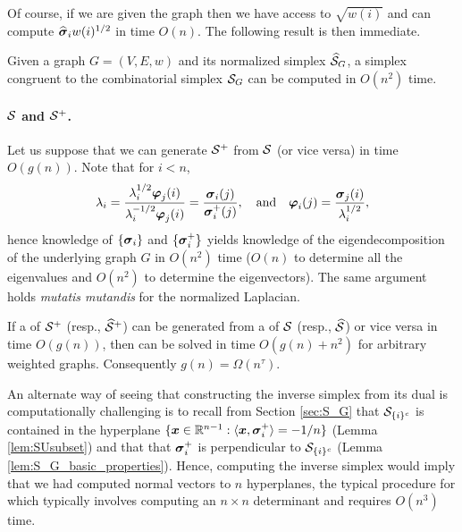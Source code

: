Of course, if we are given the graph then we have access to $\sqrt{w(i)}$ and can compute $\widehat{\vb*{\sigma}}_i w(i)^{1/2}$ in time $O(n)$. The following result is then immediate. 

\begin{lemma}
	Given a graph $G=(V,E,w)$ and its normalized simplex $\widehat{\mathcal{S}}_G$, a simplex congruent to  the combinatorial simplex $\mathcal{S}_G$ can be computed in $O(n^2)$ time. 
\end{lemma}




\paragraph{\texorpdfstring{$\mathcal{S}$}{The combinatorial} and \texorpdfstring{$\mathcal{S}^+$}{normalized simplex}.}

Let us suppose that we can generate $\mathcal{S}^+$ from $\mathcal{S}$ (or vice versa) in time $O(g(n))$. Note that for $i<n$, 
\[\lambda_i = \frac{\lambda_i^{1/2} \vb*{\varphi}_j(i)}{\lambda_i^{-1/2}\vb*{\varphi}_j(i)} = \frac{\vb*{\sigma}_i(j)}{\vb*{\sigma}_i^+(j)}, \quad \text{and} \quad \vb*{\varphi}_i(j) = \frac{\vb*{\sigma}_j(i)}{\lambda_i^{1/2}},\]
hence knowledge of $\{\vb*{\sigma}_i\}$ and $\{\vb*{\sigma}_i^+\}$ yields knowledge of the eigendecomposition of the underlying graph $G$ in $O(n^2)$ time ($O(n)$ to determine all the  eigenvalues and $O(n^2)$ to determine the eigenvectors). The same argument holds \emph{mutatis mutandis} for the normalized Laplacian. 

\begin{lemma}
	\label{lem:S_to_S^+_vdesc}
	If a \vdesc of $\mathcal{S}^+$  (resp., $\widehat{\mathcal{S}}^+$) can be generated from a \vdesc of $\mathcal{S}$ (resp., $\widehat{\mathcal{S}}$) or vice versa in time $O(g(n))$, then \lapdecomp can be solved in time $O(g(n) + n^2)$ for arbitrary weighted graphs. Consequently $g(n) = \Omega(n^\tau)$.  
\end{lemma}

An alternate way of seeing that constructing the inverse simplex from its dual is computationally challenging is to recall from Section \ref{sec:S_G} that $\mathcal{S}_{\{i\}^c}$ is contained in the hyperplane $\{\vb*{x}\in\mathbb{R}^{n-1}:\langle \vb*{x},\vb*{\sigma}_i^+\rangle = -1/n\}$ (Lemma \ref{lem:SUsubset})
 and that that $\vb*{\sigma}_i^+$ is perpendicular to $\mathcal{S}_{\{i\}^c}$ (Lemma \ref{lem:S_G_basic_properties}). Hence, computing the inverse simplex would imply that we had computed normal vectors to $n$ hyperplanes, the typical procedure for which typically involves computing an $n\times n$ determinant and requires  $O(n^3)$ time. 
 
